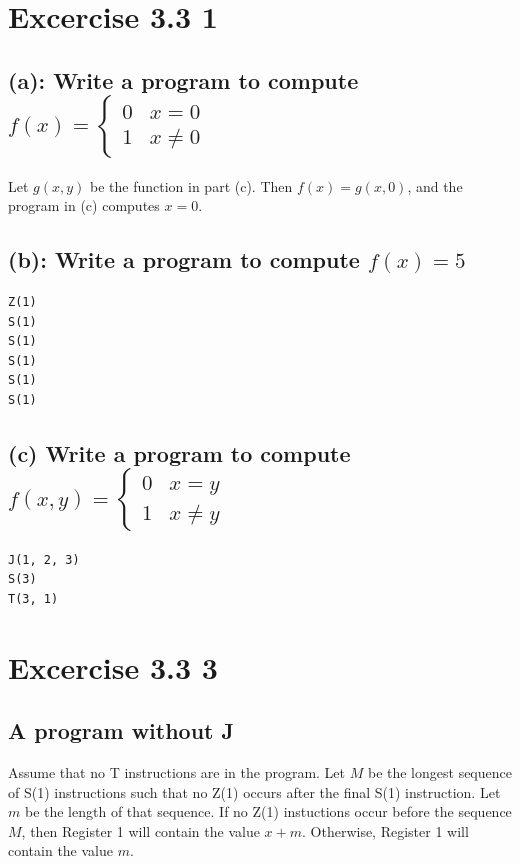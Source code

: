 \documentclass[fleqn]{article}
\begin{document}
\section*{Excercise 3.3 1}

\subsection*{(a): Write a program to compute $f(x) = \begin{cases}0 & x = 0 \\ 1 & x \neq 0\end{cases}$}

Let $g(x, y)$ be the function in part (c).
Then $f(x) = g(x, 0)$, and the program in (c) computes $x=0$.

\subsection*{(b): Write a program to compute $f(x) = 5$}

\begin{lstlisting}
Z(1)
S(1)
S(1)
S(1)
S(1)
S(1)
\end{lstlisting}

\subsection*{(c) Write a program to compute $f(x, y) = \begin{cases}0 & x = y \\ 1 & x \neq y\end{cases}$}

\begin{lstlisting}
J(1, 2, 3)
S(3)
T(3, 1)
\end{lstlisting}

\section*{Excercise 3.3 3}

\subsection*{A program without J}

Assume that no T instructions are in the program.
Let $M$ be the longest sequence of S(1) instructions such that no Z(1) occurs after the final S(1) instruction.
Let $m$ be the length of that sequence.
If no Z(1) instuctions occur before the sequence $M$, then Register 1 will contain the value $x+m$.
Otherwise, Register 1 will contain the value $m$.
\end{document}
